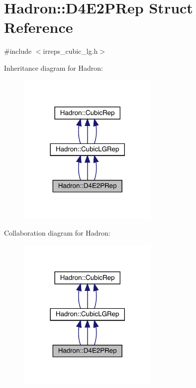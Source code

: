 \hypertarget{structHadron_1_1D4E2PRep}{}\section{Hadron\+:\+:D4\+E2\+P\+Rep Struct Reference}
\label{structHadron_1_1D4E2PRep}


{\ttfamily \#include $<$irreps\+\_\+cubic\+\_\+lg.\+h$>$}



Inheritance diagram for Hadron\+:
\nopagebreak
\begin{figure}[H]
\begin{center}
\leavevmode
\includegraphics[width=192pt]{d9/d99/structHadron_1_1D4E2PRep__inherit__graph}
\end{center}
\end{figure}


Collaboration diagram for Hadron\+:
\nopagebreak
\begin{figure}[H]
\begin{center}
\leavevmode
\includegraphics[width=192pt]{d5/d68/structHadron_1_1D4E2PRep__coll__graph}
\end{center}
\end{figure}

